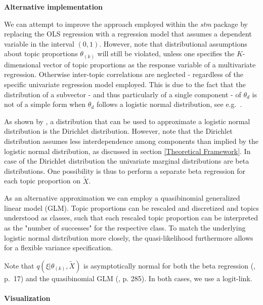 \noindent \textbf{Alternative implementation} \vspace{10px}

\noindent We can attempt to improve the approach employed within the \textit{stm} package by replacing the OLS regression with a regression model that assumes a dependent variable in the interval $(0,1)$. However, note that distributional assumptions about topic proportions $\theta_{(k)}$ will still be violated, unless one specifies the $K$-dimensional vector of topic proportions as the response variable of a multivariate regression. Otherwise inter-topic correlations are neglected - regardless of the specific univariate regression model employed. This is due to the fact that the distribution of a subvector - and thus particularly of a single component - of $\theta_d$ is not of a simple form when $\theta_d$ follows a logistic normal distribution, see e.g.\ \cite{atchison1980logistic}.

As shown by \cite{atchison1980logistic}, a distribution that can be used to approximate a logistic normal distribution is the Dirichlet distribution. However, note that the Dirichlet distribution assumes less interdependence among components than implied by the logistic normal distribution, as discussed in section \ref{Theoretical Framework}. In case of the Dirichlet distribution the univariate marginal distributions are beta distributions. One possibility is thus to perform a separate beta regression for each topic proportion on $\tilde{X}$. 

As an alternative approximation we can employ a quasibinomial generalized linear model (GLM). Topic proportions can be rescaled and discretized and topics understood as classes, such that each rescaled topic proportion can be interpreted as the "number of successes" for the respective class. To match the underlying logistic normal distribution more closely, the quasi-likelihood furthermore allows for a flexible variance specification.

Note that $q(\xi| \theta_{(k)}, \tilde{X})$ is asymptotically normal for both the beta regression (\citealp{ferrari2004beta}, p.\ 17) and the quasibinomial GLM (\citealp{fahrmeir2007regression}, p. 285). In both cases, we use a logit-link. \\
\\
\noindent \textbf{Visualization} \vspace{10px}


